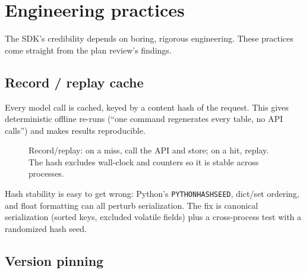 \chapter{Engineering practices}
\label{ch:engineering}

The SDK's credibility depends on boring, rigorous engineering. These practices come straight
from the plan review's findings.

\section{Record / replay cache}

Every model call is cached, keyed by a content hash of the request. This gives deterministic
offline re-runs (``one command regenerates every table, no API calls'') and makes results
reproducible.

\begin{figure}[h]\centering
{}
\caption{Record/replay: on a miss, call the API and store; on a hit, replay. The hash
excludes wall-clock and counters so it is stable across processes.}
\label{fig:replay}
\end{figure}

\begin{pitfall}
Hash stability is easy to get wrong: Python's \texttt{PYTHONHASHSEED}, dict/set ordering, and
float formatting can all perturb serialization. The fix is canonical serialization (sorted
keys, excluded volatile fields) plus a cross-process test with a randomized hash seed.
\end{pitfall}

\section{Version pinning}

